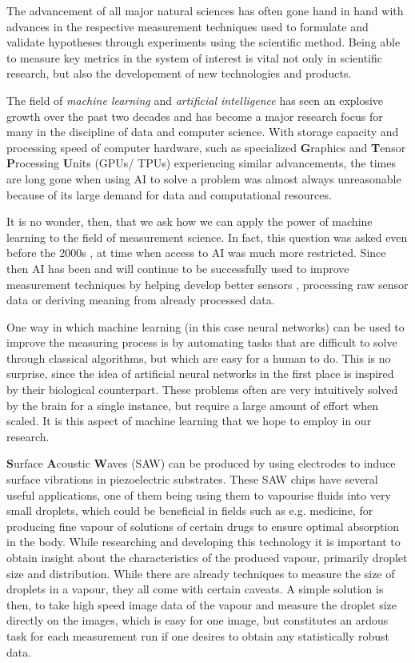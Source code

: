 The advancement of all major natural sciences has often gone hand in hand with advances in the respective measurement techniques used to formulate and validate hypotheses through experiments using the scientific method. 
Being able to measure key metrics in the system of interest is vital not only in scientific research, but also the developement of new technologies and products. 

The field of \emph{machine learning} and \emph{artificial intelligence} has seen an explosive growth over the past two decades and has become a major research focus for many in the discipline of data and computer science. 
With storage capacity and processing speed of computer hardware, such as specialized \textbf{G}raphics and \textbf{T}ensor \textbf{P}rocessing \textbf{U}nits (GPUs/ TPUs) experiencing similar advancements, the times are long gone when using AI to solve a problem was almost always unreasonable because of its large demand for data and computational resources. 

It is no wonder, then, that we ask how we can apply the power of machine learning to the field of measurement science. In fact, this question was asked even before the 2000s \cite{alippiArtificialIntelligenceInstruments1998}, at time when access to AI was much more restricted. Since then AI has been and will continue to be successfully used to improve measurement techniques by helping develop better sensors \cite{ballardMachineLearningComputationenabled2021}, processing raw sensor data or deriving meaning from already processed data. 

One way in which machine learning (in this case neural networks) can be used to improve the measuring process is by automating tasks that are difficult to solve through classical algorithms, but which are easy for a human to do. This is no surprise, since the idea of artificial neural networks in the first place is inspired by their biological counterpart. These problems often are very intuitively solved by the brain for a single instance, but require a large amount of effort when scaled. 
It is this aspect of machine learning that we hope to employ in our research. 

\textbf{S}urface \textbf{A}coustic \textbf{W}aves (SAW) can be produced by using electrodes to induce surface vibrations in piezoelectric substrates. These SAW chips have several useful applications, one of them being using them to vapourise fluids into very small droplets, which could be beneficial in fields such as e.g. medicine, for producing fine vapour of solutions of certain drugs to ensure optimal absorption in the body.
While researching and developing this technology it is important to obtain insight about the characteristics of the produced vapour, primarily droplet size and distribution. While there are already techniques to measure the size of droplets in a vapour, they all come with certain caveats. A simple solution is then, to take high speed image data of the vapour and measure the droplet size directly on the images, which is easy for one image, but constitutes an ardous task for each measurement run if one desires to obtain any statistically robust data.

